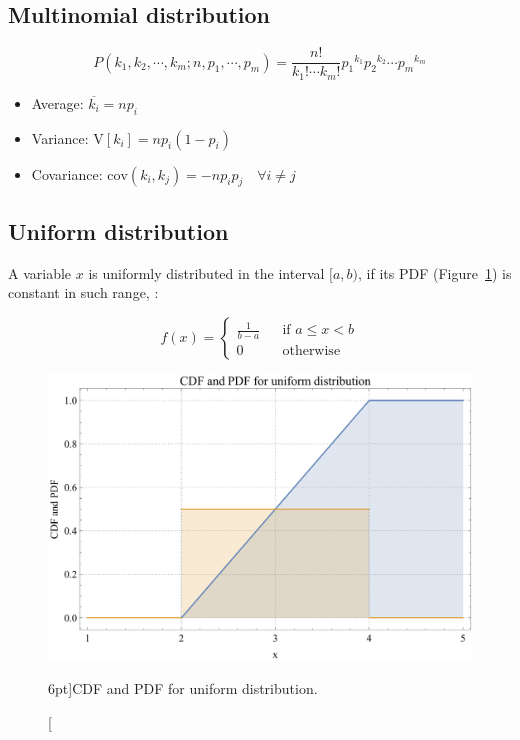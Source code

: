 \subsection{Multinomial distribution}
\label{subsec:multinomial_distr}


\begin{equation}\label{eq:multinomial_distr}
	P(k_{1}, k_{2}, \cdots, k_{m} ; n, p_{1}, \cdots, p_{m}) 
	= \frac{n!}{k_{1}! \cdots k_{m}!} {p_{1}}^{k_{1}} {p_{2}}^{k_{2}} \cdots {p_{m}}^{k_{m}}
\end{equation}

\begin{itemize}
	\item Average: $\overline{k_{i}} = n {p}_{i}$
	\item Variance: $\mathrm{V}\left[ k_{i} \right] = n {p}_{i} (1 - {p}_{i})$
	\item Covariance: $\mathrm{cov}\left( k_{i}, k_{j} \right) = - n {p}_{i} {p}_{j} \quad \forall i \neq j$
\end{itemize}

\subsection{Uniform distribution}
\label{subsec:uniform_distr}

A variable $x$ is uniformly distributed in the interval $[a, b)$, if its PDF (Figure~\ref{fig:CDF_PDF_uniform}) is constant in such range, \ie:

\begin{equation}\label{eq:uniform_distr}
	f(x) = \left\{
	\begin{array}{ccl}
		\frac{1}{b - a} & & {\textrm{if } a \leq x < b}\\
		0 & & {\textrm{otherwise}}
	\end{array} \right.
\end{equation}

\begin{figure}
	\includegraphics{probability/CDF_PDF_uniform.pdf}
	\caption[CDF and PDF for uniform distribution.][6pt]{CDF and PDF for uniform distribution.}
	\label{fig:CDF_PDF_uniform}
\end{figure}

